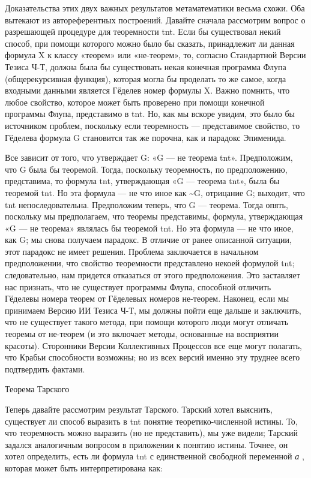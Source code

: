 \documentclass[../main.tex]{subfiles}
\begin{document}
Доказательства этих двух важных результатов метаматематики весьма схожи. Оба вытекают из автореферентных построений. Давайте сначала рассмотрим вопрос о разрешающей процедуре для теоремности \acs{tnt}\@. Если бы существовал некий способ, при помощи которого можно было бы сказать, принадлежит ли данная формула X к классу «теорем» или «не-теорем», то, согласно Стандартной Версии Тезиса Ч-Т, должна была бы существовать некая конечная программа Флупа (общерекурсивная функция), которая могла бы проделать то же самое, когда входными данными является Гёделев номер формулы X. Важно помнить, что любое свойство, которое может быть проверено при помощи конечной программы Флупа, представимо в \acs{tnt}\@. Но, как мы вскоре увидим, это было бы источником проблем, поскольку если теоремность --- представимое свойство, то Гёделева формула G становится так же порочна, как и парадокс Эпименида.

Все зависит от того, что утверждает G: «G --- не теорема \acs{tnt}». Предположим, что G была бы теоремой. Тогда, поскольку теоремность, по предположению, представима, то формула \acs{tnt}, утверждающая «G --- теорема \acs{tnt}», была бы теоремой \acs{tnt}\@. Но эта формула --- не что иное как \textasciitilde G, отрицание G; выходит, что \acs{tnt} непоследовательна. Предположим теперь, что G --- теорема. Тогда опять, поскольку мы предполагаем, что теоремы представимы, формула, утверждающая «G --- не теорема» являлась бы теоремой \acs{tnt}\@. Но эта формула --- не что иное, как G; мы снова получаем парадокс. В отличие от ранее описанной ситуации, этот парадокс не имеет решения. Проблема заключается в начальном предположении, что свойство теоремности представлено некоей формулой \acs{tnt}; следовательно, нам придется отказаться от этого предположения. Это заставляет нас признать, что не существует программы Флупа, способной отличить Гёделевы номера теорем от Гёделевых номеров не-теорем. Наконец, если мы принимаем Версию ИИ Тезиса Ч-Т, мы должны пойти еще дальше и заключить, что не существует такого метода, при помощи которого люди могут отличать теоремы от не-теорем (и это включает методы, основанные на восприятии красоты). Сторонники Версии Коллективных Процессов все еще могут полагать, что Крабьи способности возможны; но из всех версий именно эту труднее всего подтвердить фактами.

Теорема Тарского

Теперь давайте рассмотрим результат Тарского. Тарский хотел выяснить, существует ли способ выразить в \acs{tnt} понятие теоретико-численной истины. То, что теоремность можно выразить (но не представить), мы уже видели; Тарский задался аналогичным вопросом в приложении к понятию истины. Точнее, он хотел определить, есть ли формула \acs{tnt} с единственной свободной переменной \emph{а} , которая может быть интерпретирована как:
\end{document}
